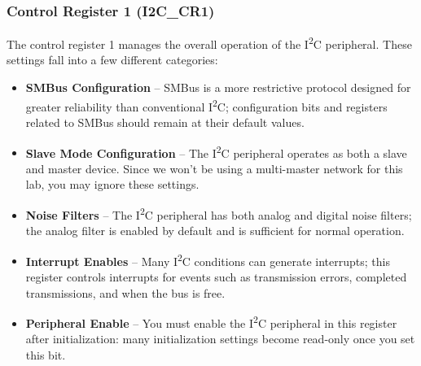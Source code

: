 \documentclass[openany,11pt,fleqn]{book} %
\begin{document}
    \subsubsection{Control Register 1 (I2C\_CR1)}
    The control register 1 manages the overall operation of the I\textsuperscript{2}C peripheral. These settings fall into a few different categories:
    \begin{itemize}
        \item \textbf{SMBus Configuration} -- SMBus is a more restrictive protocol designed for greater reliability than conventional I\textsuperscript{2}C; configuration bits and registers related to SMBus should remain at their default values. 
        \item \textbf{Slave Mode Configuration} -- The I\textsuperscript{2}C peripheral operates as both a slave and master device. Since we won't be using a multi-master network for this lab, you may ignore these settings. 
        \item \textbf{Noise Filters} -- The I\textsuperscript{2}C peripheral has both analog and digital noise filters; the analog filter is enabled by default and is sufficient for normal operation. 
        \item \textbf{Interrupt Enables} -- Many I\textsuperscript{2}C conditions can generate interrupts; this register controls interrupts for events such as transmission errors, completed transmissions, and when the bus is free. 
        \item \textbf{Peripheral Enable} -- You must enable the I\textsuperscript{2}C peripheral in this register after initialization: many initialization settings become read-only once you set this bit.
    \end{itemize}  
    
\end{document}
